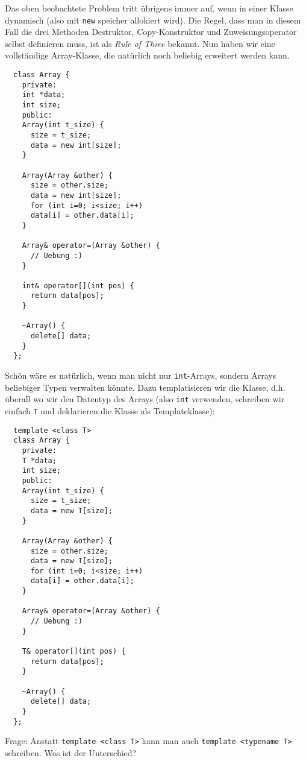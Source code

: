 \documentclass[
fontsize = 11pt,
paper    = a4,
BCOR     = 5mm,
DIV      = 12,
numbers  = noenddot,
]{scrartcl}
\def\MMS{\marginpar{%
    \vspace{-1.5em}%
    \begin{mdframed}[style=mms]%
~~???%
\end{mdframed}}}
\begin{document}
Das oben beobachtete Problem tritt übrigens immer auf, wenn in einer
Klasse dynamisch (also mit \lstinline|new| speicher allokiert wird).
Die Regel, dass man in diesem Fall die drei Methoden Destruktor,
Copy-Konstruktor und Zuweisungsoperator selbst definieren muss, ist
als \emph{Rule of Three} bekannt. Nun haben wir eine vollständige
Array-Klasse, die natürlich noch beliebig erweitert werden kann.
\begin{lstlisting}
  class Array {
    private:
    int *data;
    int size;
    public:
    Array(int t_size) {
      size = t_size;
      data = new int[size];
    }
    
    Array(Array &other) {
      size = other.size;
      data = new int[size];
      for (int i=0; i<size; i++)
      data[i] = other.data[i];
    }
    
    Array& operator=(Array &other) {
      // Uebung :)
    }
    
    int& operator[](int pos) {
      return data[pos]; 
    }
    
    ~Array() {
      delete[] data;
    }
  };
\end{lstlisting}

Schön wäre es natürlich, wenn man nicht nur \lstinline|int|-Arrays,
sondern Arrays beliebiger Typen verwalten könnte. Dazu templatisieren
wir die Klasse, d.h. überall wo wir den Datentyp des Arrays (also
\lstinline{int} verwenden, schreiben wir einfach \texttt{T} und
deklarieren die Klasse als Templateklasse):
\begin{lstlisting}
  template <class T>
  class Array {
    private:
    T *data;
    int size;
    public:
    Array(int t_size) {
      size = t_size;
      data = new T[size];
    }
    
    Array(Array &other) {
      size = other.size;
      data = new T[size];
      for (int i=0; i<size; i++)
      data[i] = other.data[i];
    }
    
    Array& operator=(Array &other) {
      // Uebung :)
    }
    
    T& operator[](int pos) {
      return data[pos];
    }
    
    ~Array() {
      delete[] data;
    }
  };
\end{lstlisting}
Frage: Anstatt \lstinline|template <class T>| kann man auch
\lstinline|template <typename T>| schreiben. Was ist der
Unterschied?\MMS
\end{document}
